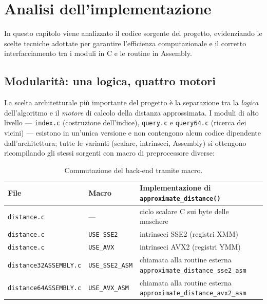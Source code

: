 \maketitle
\chapter{Analisi dell'implementazione}

In questo capitolo viene analizzato il codice sorgente del progetto, evidenziando le scelte tecniche adottate per garantire l'efficienza computazionale e il corretto interfacciamento tra i moduli in C e le routine in Assembly.

\section{Modularità: una logica, quattro motori}
La scelta architetturale più importante del progetto è la separazione tra la \emph{logica} dell'algoritmo e il \emph{motore} di calcolo della distanza approssimata. I moduli di alto livello — \texttt{index.c} (costruzione dell'indice), \texttt{query.c} e \texttt{query64.c} (ricerca dei vicini) — esistono in un'unica versione e non contengono alcun codice dipendente dall'architettura; tutte le varianti (scalare, intrinseci, Assembly) si ottengono ricompilando gli stessi sorgenti con macro di preprocessore diverse:

\begin{table}[h!]
\centering
\small
\renewcommand{\arraystretch}{1.4}
\begin{tabularx}{\textwidth}{|l|l|X|}
\hline
\textbf{File} & \textbf{Macro} & \textbf{Implementazione di \texttt{approximate\_distance()}} \\ \hline
\texttt{distance.c} & --- & ciclo scalare C sui byte delle maschere \\ \hline
\texttt{distance.c} & \texttt{USE\_SSE2} & intrinseci SSE2 (registri XMM) \\ \hline
\texttt{distance.c} & \texttt{USE\_AVX} & intrinseci AVX2 (registri YMM) \\ \hline
\texttt{distance32ASSEMBLY.c} & \texttt{USE\_SSE2\_ASM} & chiamata alla routine esterna \texttt{approximate\_distance\_sse2\_asm} \\ \hline
\texttt{distance64ASSEMBLY.c} & \texttt{USE\_AVX\_ASM} & chiamata alla routine esterna \texttt{approximate\_distance\_avx2\_asm} \\ \hline
\end{tabularx}
\caption{Commutazione del back-end tramite macro.}
\end{table}

